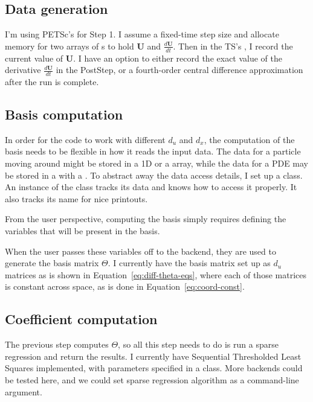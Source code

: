 \documentclass{article}
\let\vec\mathbf
\def\lstinline#1{}%
\begin{document}
\subsection{Data generation}

I'm using PETSc's \lstinline{TS} for Step 1. I assume a fixed-time step size and
allocate memory for two arrays of \lstinline{Vec}s to hold $\vec{U}$ and
$\frac{d\vec{U}}{dt}$. Then in the TS's \lstinline{PostStep}, I record the
current value of $\vec{U}$. I have an option to either record the exact value of
the derivative $\frac{d\vec{U}}{dt}$ in the PostStep, or a fourth-order central
difference approximation after the run is complete.


\subsection{Basis computation}

In order for the code to work with different $d_u$ and $d_x$, the computation of
the basis needs to be flexible in how it reads the input data. The data
for a particle moving around might be stored in a 1D \lstinline{Vec} or a
\lstinline{PetscScalar} array, while the data for a PDE may be stored in a
\lstinline{Vec} with a \lstinline{DMDA}. To abstract away the data access
details, I set up a \lstinline{Variable} class. An instance of the class tracks
its data and knows how to access it properly. It also tracks its name for nice
printouts.

From the user perspective, computing the basis simply requires defining the variables
that will be present in the basis.

When the user passes these variables off to the backend, they are used to
generate the basis matrix $\Theta$.
I currently have the basis matrix set up as $d_u$ matrices as is shown in Equation~\ref{eq:diff-theta-eqs}, where
each of those matrices is constant across space, as is done in Equation~\ref{eq:coord-const}.


\subsection{Coefficient computation}

The previous step computes $\Theta$, so all this step needs to do is run a
sparse regression and return the results. I currently have Sequential
Thresholded Least Squares implemented, with parameters specified in a
\lstinline{SparseReg} class. More backends could be tested here, and we could
set sparse regression algorithm as a command-line argument.





\end{document}
